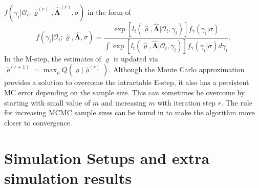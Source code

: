 \documentclass[12pt]{article}
\def\bfvarrho{\bm{\varrho}}
\def\bfgamma{\bm{\gamma}}
\def\bfLambda{\bm{\Lambda}}
\begin{document}
$f(\gamma_i|\mathcal{O}_i;\widehat{\bfvarrho}^{(r)},\widehat{\bfLambda}^{(r)},\sigma)$ in the form of
\begin{equation}
f(\gamma_i|\mathcal{O}_i;\widehat{\bfvarrho},\widehat{\bfLambda},\sigma) 
= \frac{\exp\left[l_i(\widehat{\bfvarrho},\widehat{\bfLambda}|\mathcal{O}_i,\gamma_i) \right]f_{\gamma}(\gamma_i|\sigma)}{\int \exp\left[l_i(\widehat{\bfvarrho},\widehat{\bfLambda}|\mathcal{O}_i,\gamma_i) \right]f_{\gamma}(\gamma_i|\sigma)d\gamma_i}.
\end{equation}
In the M-step, the estimates of $\bfvarrho$ is updated via $\widehat{\bfvarrho}^{(r+1)} = \max_{\bfvarrho}Q(\bfvarrho|\widehat{\bfvarrho}^{(r)}).  $
Although the Monte Carlo approximation provides a solution to overcome the intractable E-step, it also has a persistent MC error depending on the sample size. This can sometimes be overcome by starting with small value of $m$ and increasing $m$ with iteration step $r$. The rule for increasing MCMC sample sizes can be found in \cite{caffo2005ascent} to make the algorithm move closer to convergence. 



\section{Simulation Setups and extra simulation results}
\label{sec:extra simulation}
\end{document}
